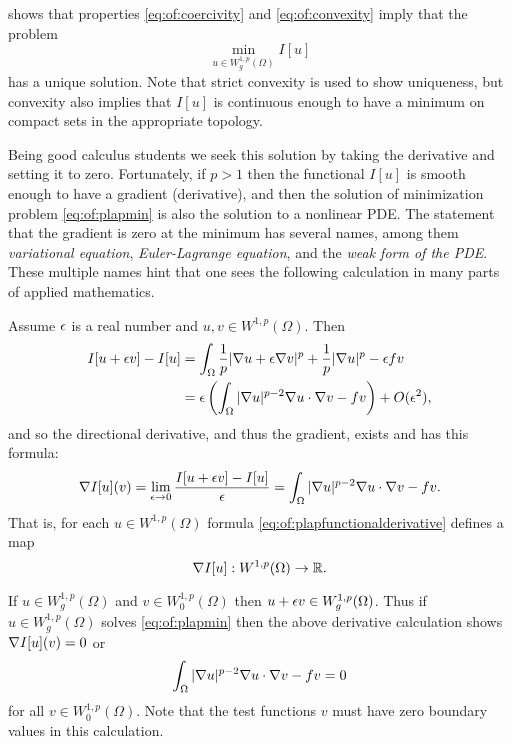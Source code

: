 \citet{Evans2010} shows that properties \eqref{eq:of:coercivity} and \eqref{eq:of:convexity} imply that the problem
\begin{equation}
\min_{u \in W_g^{1,p}(\Omega)} I[u] \label{eq:of:plapmin}
\end{equation}
has a unique solution.  Note that strict convexity is used to show uniqueness, but convexity also implies that $I[u]$ is continuous enough to have a minimum on compact sets in the appropriate topology. 

Being good calculus students we seek this solution by taking the derivative and setting it to zero.  Fortunately, if $p>1$ then the functional $I[u]$ is smooth enough to have a gradient (derivative), and then the solution of minimization problem \eqref{eq:of:plapmin} is also the solution to a nonlinear PDE.  The statement that the gradient is zero at the minimum has several names, among them \emph{variational equation}, \emph{Euler-Lagrange equation}, and the \emph{weak form of the PDE}.  These multiple names hint that one sees the following calculation in many parts of applied mathematics.

Assume $\epsilon$ is a real number and $u,v \in W^{1,p}(\Omega)$.  Then
\begin{align*}
I[u+\epsilon v] - I[u] &= \int_\Omega \frac{1}{p} |\nabla u + \epsilon \nabla v|^p + \frac{1}{p} |\nabla u|^p - \epsilon f v \\
   &= \epsilon \left(\int_\Omega |\nabla u|^{p-2} \nabla u \cdot \nabla v - f v\right) + O(\epsilon^2),
\end{align*}
and so the directional derivative, and thus the gradient, exists and has this formula:
\begin{equation}
\nabla I[u](v) = \lim_{\epsilon\to 0} \frac{I[u+\epsilon v] - I[u]}{\epsilon} = \int_\Omega |\nabla u|^{p-2} \nabla u \cdot \nabla v - f v. \label{eq:of:plapfunctionalderivative}
\end{equation}
That is, for each $u \in W^{1,p}(\Omega)$ formula \eqref{eq:of:plapfunctionalderivative} defines a map
   $$\nabla I[u] : W^{1,p}(\Omega) \to \mathbb{R}.$$

If $u \in W_g^{1,p}(\Omega)$ and $v\in W_0^{1,p}(\Omega)$ then $u+\epsilon v\in W_g^{1,p}(\Omega)$.  Thus if $u \in W_g^{1,p}(\Omega)$ solves \eqref{eq:of:plapmin} then the above derivative calculation shows $\nabla I[u](v)=0$ or
\begin{equation}
\int_\Omega |\nabla u|^{p-2} \nabla u \cdot \nabla v - f v = 0 \label{eq:of:plapweakform}
\end{equation}
for all $v\in W_0^{1,p}(\Omega)$.  Note that the test functions $v$ must have zero boundary values in this calculation.


